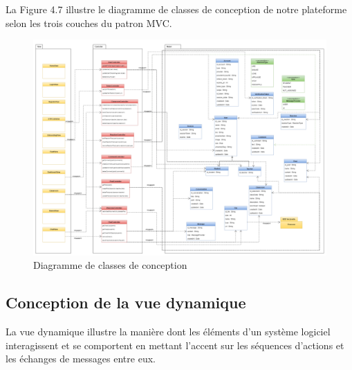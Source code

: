 La Figure 4.7 illustre le diagramme de classes de conception de notre plateforme selon les trois couches du patron MVC.
\begin{figure}[H]
    \centering
    \includegraphics[width=1.5\textwidth,height=1.12\textwidth,angle=90]{images/chp4/fig7.png}
    \caption{Diagramme de classes de conception }
    \label{fig:Diagramme de classes selon le patron MVC}    
\end{figure}

\subsection{Conception de la vue dynamique}
La vue dynamique illustre la manière dont les éléments d'un système logiciel interagissent et se comportent en mettant l'accent sur les séquences d'actions et les échanges de messages entre eux.

